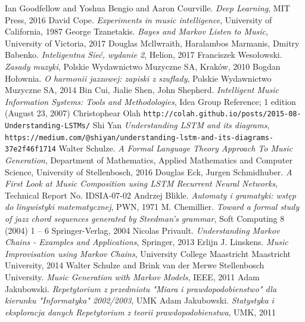 \documentclass[]{book}
\theoremstyle{definition}
\begin{document}
\begin{thebibliography}{9}
	
	Ian Goodfellow and Yoshua Bengio and Aaron Courville. \textit{Deep Learning}, MIT Press, 2016
	David Cope. \textit{Experiments in music intelligence}, University of California, 1987
	George Tzanetakis. \textit{Bayes and Markov Listen to Music}, University of Victoria, 2017
	Douglas Mcllwraith, Haralambos Marmanis, Dmitry Babenko. \textit{Inteligentna Sieć, wydanie 2}, Helion, 2017
	Franciszek Wesołowski. \textit{Zasady muzyki}, Polskie Wydawnictwo Muzyczne SA, Kraków, 2010
	Bogdan Hołownia. \textit{O harmonii jazzowej: zapiski z szuflady}, Polskie Wydawnictwo Muzyczne SA, 2014
	Bin Cui, Jialie Shen, John Shepherd. \textit{Intelligent Music Information Systems: Tools and Methodologies}, Idea Group Reference; 1 edition (August 23, 2007)
	Christophear Olah \texttt{http://colah.github.io/posts/2015-08-Understanding-LSTMs/}
	Shi Yan \textit{Understanding LSTM and its diagrams}, \\\texttt{https://medium.com/@shiyan/understanding-lstm-and-its-diagrams-37e2f46f1714}
	Walter Schulze. \textit{A Formal Language Theory Approach To Music Generation}, Department of Mathematics, Applied Mathematics and Computer Science, University of Stellenbosch, 2016
	Douglas Eck, Jurgen Schmidhuber. \textit{A First Look at Music Composition using LSTM Recurrent Neural Networks}, Technical Report No. IDSIA-07-02
	Andrzej Blikle. \textit{Automaty i gramatyki: wstęp do lingwistyki matematycznej}, PWN, 1971
	M. Chemillier. \textit{Toward a formal study of jazz chord sequences generated by Steedman’s
	grammar}, Soft Computing 8 (2004) 1 – 6  Springer-Verlag, 2004
	Nicolas Privault. \textit{Understanding Markov Chains - Examples and Applications}, Springer, 2013
	Erlijn J. Linskens. \textit{Music Improvisation using Markov Chains}, University College Maastricht Maastricht University, 2014
	Walter Schulze and Brink van der Merwe Stellenbosch University. \textit{Music Generation with Markov Models}, IEEE, 2011
	Adam Jakubowski. \textit{Repetytorium z przedmiotu "Miara i prawdopodobienstwo"	dla kierunku "Informatyka" 2002/2003}, UMK
	Adam Jakubowski. \textit{Statystyka	i eksploracja danych Repetytorium z teorii prawdopodobienstwa}, UMK, 2011

\end{thebibliography}
\end{document}
